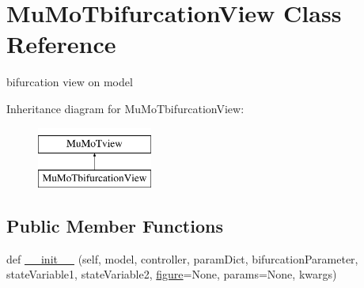 \hypertarget{class_mu_mo_t_1_1_mu_mo_tbifurcation_view}{}\section{Mu\+Mo\+Tbifurcation\+View Class Reference}
\label{class_mu_mo_t_1_1_mu_mo_tbifurcation_view}


bifurcation view on model  


Inheritance diagram for Mu\+Mo\+Tbifurcation\+View\+:\begin{figure}[H]
\begin{center}
\leavevmode
\includegraphics[height=2.000000cm]{class_mu_mo_t_1_1_mu_mo_tbifurcation_view}
\end{center}
\end{figure}
\subsection*{Public Member Functions}
\begin{DoxyCompactItemize}
\item 
def \hyperlink{class_mu_mo_t_1_1_mu_mo_tbifurcation_view_a7b55446edcef0a16d6840cd227f200b8}{\+\_\+\+\_\+init\+\_\+\+\_\+} (self, model, controller, param\+Dict, bifurcation\+Parameter, state\+Variable1, state\+Variable2, \hyperlink{class_mu_mo_t_1_1_mu_mo_tbifurcation_view_a391e34f2de441d79152a7b3d6e4c9c86}{figure}=None, params=None, kwargs)
\end{DoxyCompactItemize}
